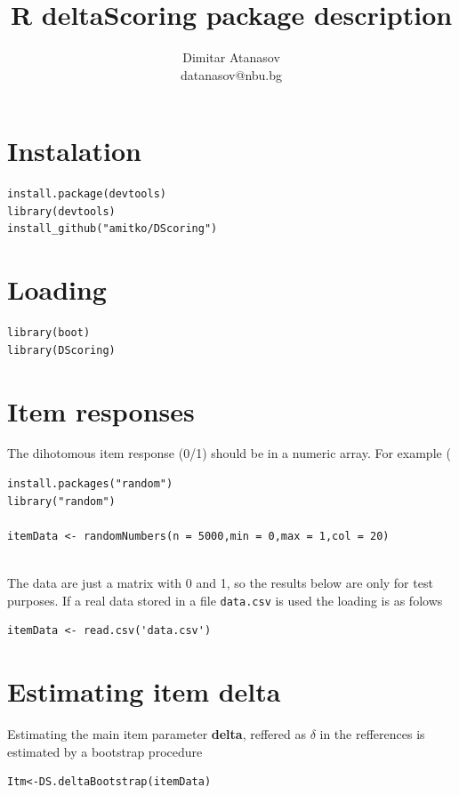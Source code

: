 \documentclass[10pt,a4paper]{article}
\begin{document}
\title{R deltaScoring package description}
\author{Dimitar Atanasov\\ datanasov@nbu.bg}

\maketitle

\section{Instalation}
\begin{lstlisting}
install.package(devtools)
library(devtools)
install_github("amitko/DScoring")
\end{lstlisting}

\section{Loading}
\begin{lstlisting}
library(boot)
library(DScoring)
\end{lstlisting}

\section{Item responses}
The dihotomous item response (0/1) should be in a numeric array. For example (
\begin{lstlisting}
install.packages("random")  
library("random")

itemData <- randomNumbers(n = 5000,min = 0,max = 1,col = 20) 
 
\end{lstlisting}

The data are just a matrix with 0 and 1, so the results below are only for test purposes. If a real data stored in a file {\tt data.csv} is used the loading is as folows
\begin{lstlisting}
itemData <- read.csv('data.csv')
\end{lstlisting}

\section{Estimating item delta}
Estimating the main item parameter {\bf delta}, reffered as $\delta$  in the refferences is estimated by a bootstrap procedure
\begin{lstlisting}
Itm<-DS.deltaBootstrap(itemData) 
\end{lstlisting}
\end{document}
